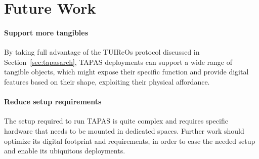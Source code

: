 \section{Future Work}
\paragraph{Support more tangibles} By taking full advantage of the \acp{TUIReO} protocol discussed in Section~\ref{sec:tapasarch}, \ac{TAPAS} deployments can support a wide range of tangible objects, which might expose their specific function and provide digital features based on their shape, exploiting their physical affordance.

\paragraph{Reduce setup requirements} The setup required to run \ac{TAPAS} is quite complex and requires specific hardware that needs to be mounted in dedicated spaces. Further work should optimize its digital footprint and requirements, in order to ease the needed setup and enable its ubiquitous deployments.